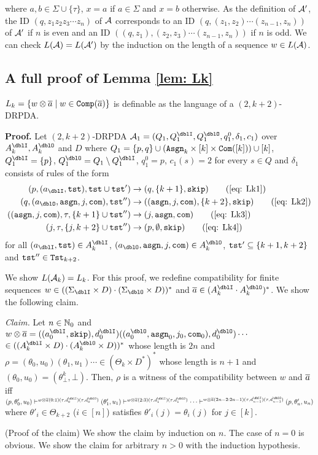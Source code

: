 where $a,b\in\Sigma\cup\{\tau\}$,
$x=a$ if $a\in\Sigma$ and $x=b$ otherwise.
As the definition of ${\cal A}'$,
the ID $(q,z_1z_2z_3\cdots z_n)$ of ${\cal A}$ corresponds to
an ID $(q, (z_1,z_2)\cdots(z_{n-1},z_n))$ of ${\cal A}'$ if $n$ is even and
an ID $((q,z_1), (z_2,z_3)\cdots(z_{n-1},z_n))$ if $n$ is odd.
We can check $L({\cal A})=L({\cal A}')$ by the induction on
the length of a sequence $w\in L({\cal A})$.

\subsection{A full proof of Lemma \ref{lem: Lk}}
\setcounter{lemma}{\ref{lem: Lk}}
\addtocounter{lemma}{-1}
\begin{lemma}
$L_k = \{w\otimes{\overline{a}} \mid w\in{\mathtt{Comp}}({\overline{a}})\}$ is definable as the language of a $(2,k+2)$-DRPDA.
\end{lemma}
{\bf Proof.}\quad
Let $(2,k+2)$-DRPDA
$\calA_1=(Q_1, Q^\dblI_1, Q^\dblO_1, q^0_1, \delta_1, c_1)$
over $A_k^\dblI, A_k^\dblO$ and $D$ where
$Q_1=\{p, q\}\cup(\mathtt{Asgn}_k\times[k]\times\mathtt{Com}([k]))\cup[k]$, $Q^\dblI_1=\{p\}$, $Q^\dblO_1 = Q_1\setminus Q^\dblI_1$, $q^0_1 = p$,
$c_1(s)=2$ for every $s\in Q$ and $\delta_1$ consists of rules of the form
\begin{align}
(p, (a_\dblI, \tst), \tst\cup\tst')&\to(q, \{k+1\}, \skip)\tag{\ref{eq: Lk1}}\\
(q, (a_\dblO, \asgn, j, \com), \tst'')&\to((\asgn,j,\com), \{k+2\},\skip)\tag{\ref{eq: Lk2}}\\
((\asgn,j,\com), \tau, \{k+1\}\cup\tst'')&\to(j, \asgn, \com)\tag{\ref{eq: Lk3}}\\
(j, \tau, \{j, k+2\}\cup\tst'')&\to(p, \emptyset, \skip)\tag{\ref{eq: Lk4}}
\end{align}
for all $(a_\dblI, \tst)\in A_k^\dblI$, $(a_\dblO, \asgn, j, \com)\in A_k^\dblO$, $\mathtt{tst}'\subseteq \{k+1,k+2\}$ and $\mathtt{tst}''\in\mathtt{Tst}_{k+2}$.

We show $L({\cal A}_k) = L_k$.
For this proof, we redefine compatibility for finite sequences $w\in ((\Sigma_\dblI\times D)\cdot (\Sigma_\dblO\times D))^*$ and $\overa\in(A_k^\dblI\cdot A_k^\dblO)^*$.
We show the following claim.
\par\medskip\noindent
{\it Claim.} Let $n\in\mathbb{N}_0$ and $w\otimes\overa = ((a^\dblI_0,\skip), d^\dblI_0)((a^\dblO_0,\asgn_0,j_0, \com_0), d^\dblO_0)\cdots$ $\in ((A_k^\dblI\times D)\cdot(A_k^\dblO\times D))^*$
whose length is $2n$ and
$\rho = (\theta_0,u_0)(\theta_1, u_1)\cdots\in (\Theta_k\times D^*)^*$ whose length is $n+1$ and $(\theta_0, u_0)=(\theta^{k}_\bot, \bot)$.
Then,
$\rho$ is a witness of the compatibility between $w$ and ${\overline{a}}$ iff
$(p,\theta'_0,u_0)\vdash^{w\otimes\overa(0:1)(\tau,d^\dblI_{0})(\tau,d^\dblO_{0})}(\theta'_1,u_1)\vdash^{w\otimes\overa(2:3)(\tau,d^\dblI_{1})(\tau,d^\dblO_{1})}\cdots\vdash^{w\otimes\overa(2n-2:2n-1)(\tau,d^\dblI_{n-1})(\tau,d^\dblO_{n-1})}(p,\theta'_{n},u_{n})$
where $\theta'_i\in \Theta_{k+2}$ ($i\in[n]$) satisfies $\theta'_i(j)=\theta_i(j)$ for $j\in[k]$.
\par\medskip\noindent
(Proof of the claim)
We show the claim by induction on $n$.
The case of $n=0$ is obvious.
We show the claim for arbitrary $n>0$ with the induction hypothesis.

